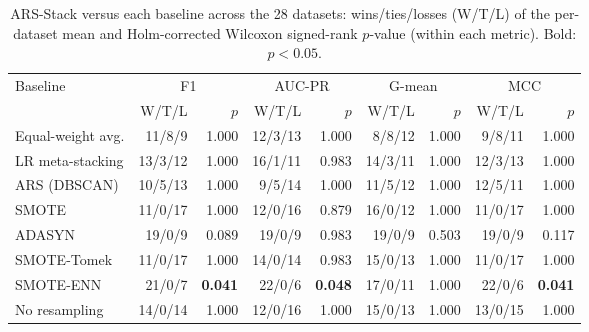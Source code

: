 \begin{table}[t]\centering\small
\caption{ARS-Stack versus each baseline across the 28 datasets: wins/ties/losses (W/T/L) of the per-dataset mean and Holm-corrected Wilcoxon signed-rank $p$-value (within each metric). Bold: $p<0.05$.}
\label{tab:xtests}
\begin{tabular}{lrrrrrrrr}
\toprule
Baseline & \multicolumn{2}{c}{F1} & \multicolumn{2}{c}{AUC-PR} & \multicolumn{2}{c}{G-mean} & \multicolumn{2}{c}{MCC} \\
 & W/T/L & $p$ & W/T/L & $p$ & W/T/L & $p$ & W/T/L & $p$ \\
\midrule
Equal-weight avg. & 11/8/9 & 1.000 & 12/3/13 & 1.000 & 8/8/12 & 1.000 & 9/8/11 & 1.000 \\
LR meta-stacking & 13/3/12 & 1.000 & 16/1/11 & 0.983 & 14/3/11 & 1.000 & 12/3/13 & 1.000 \\
ARS (DBSCAN) & 10/5/13 & 1.000 & 9/5/14 & 1.000 & 11/5/12 & 1.000 & 12/5/11 & 1.000 \\
SMOTE & 11/0/17 & 1.000 & 12/0/16 & 0.879 & 16/0/12 & 1.000 & 11/0/17 & 1.000 \\
ADASYN & 19/0/9 & 0.089 & 19/0/9 & 0.983 & 19/0/9 & 0.503 & 19/0/9 & 0.117 \\
SMOTE-Tomek & 11/0/17 & 1.000 & 14/0/14 & 0.983 & 15/0/13 & 1.000 & 11/0/17 & 1.000 \\
SMOTE-ENN & 21/0/7 & \textbf{0.041} & 22/0/6 & \textbf{0.048} & 17/0/11 & 1.000 & 22/0/6 & \textbf{0.041} \\
No resampling & 14/0/14 & 1.000 & 12/0/16 & 1.000 & 15/0/13 & 1.000 & 13/0/15 & 1.000 \\
\bottomrule
\end{tabular}
\end{table}